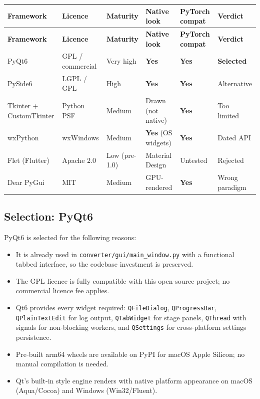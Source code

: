 \documentclass[12pt]{article}
\newcommand{\filepath}[1]{\texttt{\small #1}}
\newcommand{\code}[1]{\texttt{#1}}
\newcommand{\yes}{\textcolor{green!60!black}{\textbf{Yes}}}
\begin{document}
\begin{longtable}{|l|l|l|l|l|l|}
\hline
\textbf{Framework} & \textbf{Licence} & \textbf{Maturity} & \textbf{Native look} & \textbf{PyTorch compat} & \textbf{Verdict} \\
\hline
\endfirsthead
\hline
\textbf{Framework} & \textbf{Licence} & \textbf{Maturity} & \textbf{Native look} & \textbf{PyTorch compat} & \textbf{Verdict} \\
\hline
\endhead
\hline
\endfoot
PyQt6 & GPL / commercial & Very high & \yes & \yes & \textbf{Selected} \\
\hline
PySide6 & LGPL / GPL & High & \yes & \yes & Alternative \\
\hline
Tkinter + CustomTkinter & Python PSF & Medium & Drawn (not native) & \yes & Too limited \\
\hline
wxPython & wxWindows & Medium & \yes{} (OS widgets) & \yes & Dated API \\
\hline
Flet (Flutter) & Apache 2.0 & Low (pre-1.0) & Material Design & Untested & Rejected \\
\hline
Dear PyGui & MIT & Medium & GPU-rendered & \yes & Wrong paradigm \\
\hline
\end{longtable}

\subsection{Selection: PyQt6}

PyQt6 is selected for the following reasons:

\begin{itemize}
\item It is already used in \filepath{converter/gui/main\_window.py} with a functional tabbed interface, so the codebase investment is preserved.
\item The GPL licence is fully compatible with this open-source project; no commercial licence fee applies.
\item Qt6 provides every widget required: \code{QFileDialog}, \code{QProgressBar}, \code{QPlainTextEdit} for log output, \code{QTabWidget} for stage panels, \code{QThread} with signals for non-blocking workers, and \code{QSettings} for cross-platform settings persistence.
\item Pre-built arm64 wheels are available on PyPI for macOS Apple Silicon; no manual compilation is needed.
\item Qt's built-in style engine renders with native platform appearance on macOS (Aqua/Cocoa) and Windows (Win32/Fluent).
\end{itemize}
\end{document}
